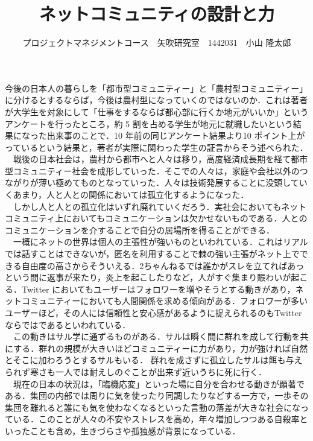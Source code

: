\documentclass[uplatex,twocolumn,dvipdfmx]{jsarticle}
\title{\vspace{-5mm}\fontsize{14pt}{0pt}\selectfont ネットコミュニティの設計と力}
\author{\normalsize プロジェクトマネジメントコース　矢吹研究室　1442031　小山 隆太郎}
\date{}
\begin{document}
\fontsize{10.5pt}{\baselineskip}\selectfont
\maketitle






今後の日本人の暮らしを「都市型コミュニティー」と「農村型コミュニティー」に分けるとするならば，今後は農村型になっていくのではないのか．これは著者が大学生を対象にして「仕事をするならば都心部に行くか地元がいいか」というアンケートを行ったところ，約 5 割を占める学生が地元に就職したいという結果になった出来事のことで．10 年前の同じアンケート結果より10 ポイント上がっているという結果と，著者が実際に関わった学生の証言からそう述べられた．\\
　戦後の日本社会は，農村から都市へと人々は移り，高度経済成長期を経て都市型コミュニティー社会を成形していった．そこでの人々は，家庭や会社以外のつながりが薄い極めてものとなっていった．人々は技術発展することに没頭していくあまり，人と人との関係においては孤立化するようになった．\\
　しかし人と人との孤立化はいずれ廃れていくだろう．実社会においてもネットコミュニティ上においてもコミュニケーションは欠かせないものである．人とのコミュニケーションを介することで自分の居場所を得ることができる．\\
　一概にネットの世界は個人の主張性が強いものといわれている．これはリアルでは話すことはできないが，匿名を利用することで棘の強い主張がネット上でできる自由度の高さからそういえる．2ちゃんねるでは誰かがスレを立てればあっという間に返事が来たり，炎上を起こしたりなど，人がすぐ集まり賑わいが起こる．Twitter においてもユーザーはフォロワーを増やそうとする動きがあり，ネットコミュニティーにおいても人間関係を求める傾向がある．フォロワーが多いユーザーほど，その人には信頼性と安心感があるように捉えられるのもTwitterならではであるといわれている．\\
　この動きはサル学に通ずるものがある．サルは瞬く間に群れを成して行動を共にする．群れの規模が大きいほどコミュニティーに力があり，力が強ければ自然とそこに加わろうとするサルもいる． 群れを成さずに孤立したサルは餌も与えられず寒さも一人では耐えしのぐことが出来ず近いうちに死に行く．\\
　現在の日本の状況は，「臨機応変」といった場に自分を合わせる動きが顕著である．集団の内部では周りに気を使ったり同調したりなどする一方で，一歩その集団を離れると誰にも気を使わなくなるといった言動の落差が大きな社会になっている．このことが人々の不安やストレスを高め，年々増加しつつある自殺率といったことも含め，生きづらさや孤独感が背景になっている．\\
\end{document}
